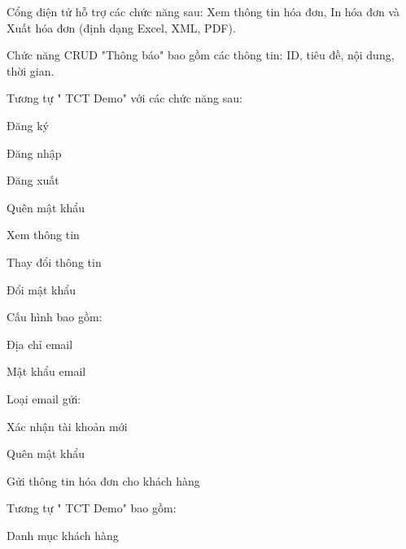 Cổng điện tử hỗ trợ các chức năng sau: Xem thông tin hóa đơn, In hóa đơn và Xuất hóa đơn (định dạng Excel, XML, PDF).











Chức năng CRUD "Thông báo" bao gồm các thông tin: ID, tiêu đề, nội dung, thời gian.


Tương tự " TCT Demo" với các chức năng sau:

Đăng ký

Đăng nhập

Đăng xuất

Quên mật khẩu

Xem thông tin

Thay đổi thông tin

Đổi mật khẩu


Cấu hình bao gồm:

Địa chỉ email

Mật khẩu email

Loại email gửi:

Xác nhận tài khoản mới

Quên mật khẩu

Gửi thông tin hóa đơn cho khách hàng


Tương tự " TCT Demo" bao gồm:

Danh mục khách hàng

